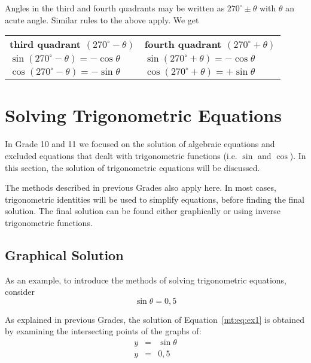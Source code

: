 {
Angles in the third and fourth quadrants may be written as $270^\circ \pm \theta$ with $\theta$ an acute angle. Similar rules to the above apply. We get
\begin{center}
\begin{tabular}{l|l}
\textbf{third quadrant $(270^\circ-\theta)$} & \textbf{fourth quadrant $(270^\circ+\theta)$} \\
 $\sin(270^\circ-\theta) = -\cos\theta$ & $\sin(270^\circ+\theta) = -\cos\theta$ \\
 $\cos(270^\circ-\theta) = -\sin\theta$ & $\cos(270^\circ+\theta) = +\sin\theta$ \\
\end{tabular}
\end{center}
} %


\section{Solving Trigonometric Equations}
\label{m:t11:e}


In Grade 10 and 11 we focused on the solution of algebraic equations and excluded equations that dealt with trigonometric functions (i.e. $\sin$ and $\cos$). In this section, the solution of trigonometric equations will be discussed. 

The methods described in previous Grades also apply here. 
In most cases, trigonometric identities will be used to simplify equations, before finding the final solution. The final solution can be found either graphically or using inverse trigonometric functions.

\subsection{Graphical Solution}
As an example, to introduce the methods of solving trigonometric equations, consider
\begin{equation}
\label{mt:eq:ex1}
\sin \theta = 0,5
\end{equation}

As explained in previous Grades,%
 the solution of Equation~\ref{mt:eq:ex1} is obtained by examining the intersecting points of the graphs of:
\begin{eqnarray*}
y&=&\sin \theta\\
y&=&0,5
\end{eqnarray*}


